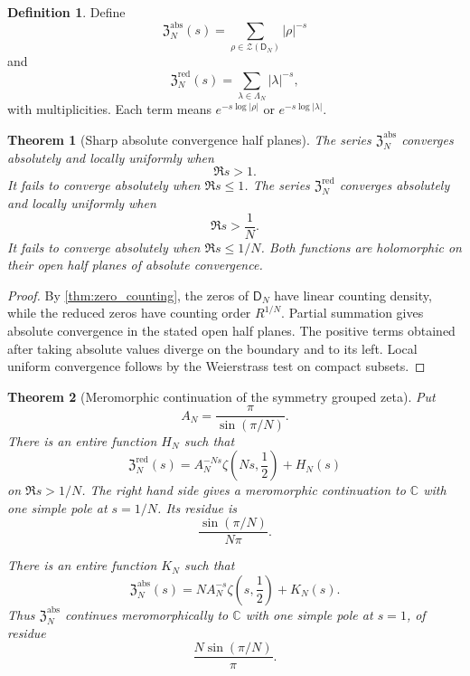 \documentclass{aomart}
\newtheorem{theorem}{Theorem}[section]
\theoremstyle{definition}
\newtheorem{definition}[definition]{Definition}
\theoremstyle{remark}
\newcommand{\CC}{\mathbb C}
\newcommand{\Zcal}{\mathcal Z}
\newcommand{\Dfun}{\mathsf D}
\begin{document}
\begin{definition}\label{def:absolute_zero_zetas}
Define
\[
\mathfrak Z_N^{\mathrm{abs}}(s)
=
\sum_{\rho\in\Zcal(\Dfun_N)}|\rho|^{-s}
\]
and
\[
\mathfrak Z_N^{\mathrm{red}}(s)
=
\sum_{\lambda\in\Lambda_N}|\lambda|^{-s},
\]
with multiplicities.  Each term means $e^{-s\log|\rho|}$ or $e^{-s\log|\lambda|}$.
\end{definition}

\begin{theorem}[Sharp absolute convergence half planes]\label{thm:zeta_convergence}
The series $\mathfrak Z_N^{\mathrm{abs}}$ converges absolutely and locally uniformly when
\[
\Re s>1.
\]
It fails to converge absolutely when $\Re s\leq1$.  The series $\mathfrak Z_N^{\mathrm{red}}$ converges absolutely and locally uniformly when
\[
\Re s>\frac1N.
\]
It fails to converge absolutely when $\Re s\leq1/N$.  Both functions are holomorphic on their open half planes of absolute convergence.
\end{theorem}

\begin{proof}
By \cref{thm:zero_counting}, the zeros of $\Dfun_N$ have linear counting density, while the reduced zeros have counting order $R^{1/N}$.  Partial summation gives absolute convergence in the stated open half planes.  The positive terms obtained after taking absolute values diverge on the boundary and to its left.  Local uniform convergence follows by the Weierstrass test on compact subsets.
\end{proof}

\begin{theorem}[Meromorphic continuation of the symmetry grouped zeta]\label{thm:zeta_continuation}
Put
\[
A_N=\frac\pi{\sin(\pi/N)}.
\]
There is an entire function $H_N$ such that
\[
\mathfrak Z_N^{\mathrm{red}}(s)
=
A_N^{-Ns}\zeta\left(Ns,\frac12\right)+H_N(s)
\]
on $\Re s>1/N$.  The right hand side gives a meromorphic continuation to $\CC$ with one simple pole at $s=1/N$.  Its residue is
\[
\frac{\sin(\pi/N)}{N\pi}.
\]

There is an entire function $K_N$ such that
\[
\mathfrak Z_N^{\mathrm{abs}}(s)
=
N A_N^{-s}\zeta\left(s,\frac12\right)+K_N(s).
\]
Thus $\mathfrak Z_N^{\mathrm{abs}}$ continues meromorphically to $\CC$ with one simple pole at $s=1$, of residue
\[
\frac{N\sin(\pi/N)}\pi.
\]
\end{theorem}
\end{document}
